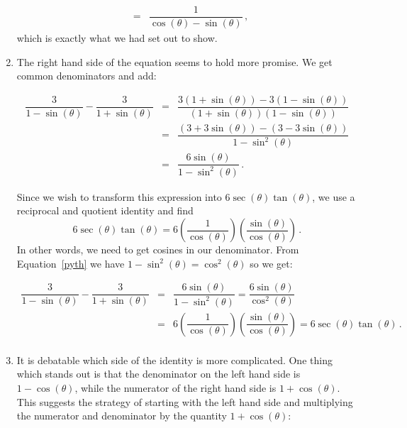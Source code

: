 \begin{example}
\begin{enumerate}
\[\begin{array}{rcl}
                                                           & = & \dfrac{1}{\cos(\theta) - \sin(\theta)}\,, \end{array} \]
which is exactly what we had set out to show.  

\item  The right hand side of the equation seems to hold more promise.  We get common denominators and add:

\[ \begin{array}{rcl}

\dfrac{3}{1-\sin(\theta)} - \dfrac{3}{1 + \sin(\theta)} & = & \dfrac{3(1 + \sin(\theta)) - 3(1-\sin(\theta))}{(1 + \sin(\theta))(1-\sin(\theta))} \\ [.25in]
                                                        & = & \dfrac{(3 + 3\sin(\theta)) - (3 - 3\sin(\theta))}{1 - \sin^{2}(\theta)} \\ [.25in]                                                        																																	& = & \dfrac{6 \sin(\theta)}{1 - \sin^{2}(\theta)}\,. \end{array} \]

Since we wish to transform this expression into $6\sec(\theta) \tan(\theta)$,  
we use a reciprocal and quotient identity and find $$
6\sec(\theta) \tan(\theta) = 6 \left(\frac{1}{\cos(\theta)}\right) \left(\frac{\sin(\theta)}{\cos(\theta)}\right)\,.$$
In other words, we need to get cosines in our denominator. From Equation~\eqref{pyth} we have $1 -  \sin^{2}(\theta) = \cos^{2}(\theta)$ so we get:

\[ \begin{array}{rcl}

\dfrac{3}{1-\sin(\theta)} - \dfrac{3}{1 + \sin(\theta)} & = & \dfrac{6 \sin(\theta)}{1 - \sin^{2}(\theta)}= \dfrac{6 \sin(\theta)}{\cos^{2}(\theta)} \\ [.25in]
& = &  6 \left(\dfrac{1}{\cos(\theta)}\right)\left( \dfrac{\sin(\theta)}{\cos(\theta)}\right) = 6 \sec(\theta) \tan(\theta) \,.\\ \end{array} \]

\item  It is debatable which side of the identity is more complicated.  One thing which stands out is that the denominator on the left hand side is $1-\cos(\theta)$, while the numerator of the right hand side is $1+\cos(\theta)$.  This suggests the strategy of starting with the left hand side and multiplying the numerator and denominator by the quantity $1+\cos(\theta)$:


\end{enumerate}
\end{example}
